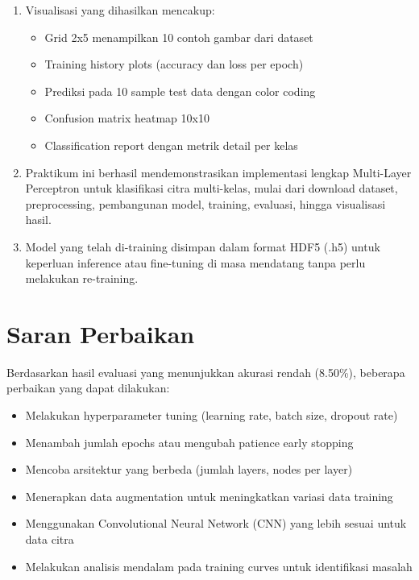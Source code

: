 \documentclass[12pt,a4paper]{article}
\begin{document}
\begin{enumerate}
    \item Visualisasi yang dihasilkan mencakup:
    \begin{itemize}
        \item Grid 2x5 menampilkan 10 contoh gambar dari dataset
        \item Training history plots (accuracy dan loss per epoch)
        \item Prediksi pada 10 sample test data dengan color coding
        \item Confusion matrix heatmap 10x10
        \item Classification report dengan metrik detail per kelas
    \end{itemize}
    
    \item Praktikum ini berhasil mendemonstrasikan implementasi lengkap Multi-Layer Perceptron untuk klasifikasi citra multi-kelas, mulai dari download dataset, preprocessing, pembangunan model, training, evaluasi, hingga visualisasi hasil.
    
    \item Model yang telah di-training disimpan dalam format HDF5 (.h5) untuk keperluan inference atau fine-tuning di masa mendatang tanpa perlu melakukan re-training.
\end{enumerate}

\section{Saran Perbaikan}

Berdasarkan hasil evaluasi yang menunjukkan akurasi rendah (8.50\%), beberapa perbaikan yang dapat dilakukan:

\begin{itemize}
    \item Melakukan hyperparameter tuning (learning rate, batch size, dropout rate)
    \item Menambah jumlah epochs atau mengubah patience early stopping
    \item Mencoba arsitektur yang berbeda (jumlah layers, nodes per layer)
    \item Menerapkan data augmentation untuk meningkatkan variasi data training
    \item Menggunakan Convolutional Neural Network (CNN) yang lebih sesuai untuk data citra
    \item Melakukan analisis mendalam pada training curves untuk identifikasi masalah
\end{itemize}
\end{document}
